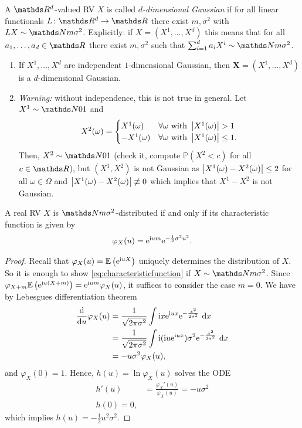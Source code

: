 \begin{defi}
A $\Rd$-valued RV $X$ is called \emph{$d$-dimensional Gaussian} if for all linear functionals $L\colon \Rd\to \R$ there exist $m,\sigma^2$ with $LX\sim \N{m}{\sigma^2}$.
Explicitly: if $X=(X^1,\dots,X^d)$ this means that for all $a_1,\dots,a_d \in \R$ there exist $m,\sigma^2$ such that $\sum_{i=1}^d a_i X^i \sim \N{m}{\sigma^2}$.
\end{defi}

\begin{bsp}
\begin{enumerate}[label=(\alph*)]
\item If $X^1,\dots,X^d$ are independent $1$-dimensional Gaussian, then 
$\textbf{X}=(X^1,\dots,X^d)$ is a $d$-dimensional Gaussian.
\item \emph{Warning:} without independence, this is not true in general.
Let $X^1\sim \N01$ and
\begin{align*}
X^2(\omega)=\begin{cases}
X^1(\omega)~~&\forall \omega \text{ with } \left\vert X^1(\omega)\right\vert>1\\
-X^1(\omega)&\forall \omega \text{ with } \left\vert X^1(\omega)\right\vert\leq 1.
\end{cases}
\end{align*}
Then, $X^2\sim \N01$ (check it, compute $\mathds{P}(X^2<c)$ for all $c\in \R$), but $(X^1,X^2)$ is not Gaussian as
$\left\vert X^1(\omega)-X^2(\omega)\right\vert\leq 2$ for all $\omega \in \Omega$ and
$\left\vert X^1(\omega)-X^2(\omega)\right\vert\not \equiv 0$ which implies that $X^1-X^2$ is not Gaussian.
\end{enumerate}
\end{bsp}

\begin{prop}
A real RV $X$ is $\N{m}{\sigma^2}$-distributed if and only if
its characteristic function is given by
\begin{align}\label{eq:characteristicfunction}
\varphi_X(u)=\mathrm{e}^{\mathrm{i} um}\mathrm{e}^{-\frac{1}{2}\sigma^2u^2}.
\end{align}
\begin{proof}
Recall that $\varphi_X(u)=\mathbb{E}\left(\mathrm{e}^{\mathrm{i} uX}\right)$ uniquely determines the distribution of $X$.
So it is enough to show \eqref{eq:characteristicfunction} if
$X\sim \N{m}{\sigma^2}$.
Since $\varphi_{X+m}\mathbb{E}\left(\mathrm{e}^{\mathrm{i} u(X+m)}\right)=\mathrm{e}^{\mathrm{i} um}\varphi_X(u)$,
it suffices to consider the case $m=0$. We have by Lebesgues differentiation theorem
\begin{align*}
\frac{\mathrm{d}}{\mathrm{d}u}\varphi_X(u)&=\frac{1}{\sqrt{2\pi \sigma^2}} \int \mathrm{i} x\mathrm{e}^{\mathrm{i} ux}\mathrm{e}^{-\frac{x^2}{2 \sigma^2}}~\mathrm{d}x\\
&=\frac{1}{\sqrt{2 \pi \sigma^2}} \int \mathrm{i} (\mathrm{i} u \mathrm{e}^{\mathrm{i} ux})\sigma^2 \mathrm{e}^{-\frac{x^2}{2 \sigma^2}}~\mathrm{d}x\\
&=-u \sigma^2 \varphi_X(u),
\end{align*}
and $\varphi_X(0)=1$. Hence, $h(u)=\ln \varphi_X(u)$ solves the ODE
\begin{align*}
h'(u)&=\frac{\varphi_X'(u)}{\varphi_X(u)}=-u \sigma^2\\
h(0)=0,
\end{align*}
which implies $h(u)=-\frac{1}{2}u^2\sigma^2$.
\end{proof}
\end{prop}

